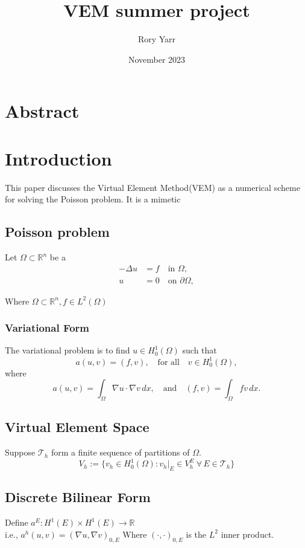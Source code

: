 \documentclass{article}
\title{VEM summer project}
\author{Rory Yarr}
\date{November 2023}
\begin{document}
\maketitle

\tableofcontents

\section{Abstract}



\section{Introduction}

This paper discusses the Virtual Element Method(VEM) as a numerical scheme for solving the Poisson problem. It is a mimetic 

\subsection{Poisson problem}
Let $\Omega \subset \mathbb{R}^n$ be a
\begin{align}
    -\Delta u &= f \quad \text{in } \Omega, \label{eq:poisson}\\
    u &= 0 \quad \text{on } \partial \Omega, \label{eq:dirichlet}
\end{align}

Where $\Omega \subset \mathbb{R}^n, f \in L^2(\Omega)$ %

\subsubsection{Variational Form}
The variational problem is to find $ u \in H^1_0(\Omega)$ such that 
\[ a(u,v) = (f,v), \quad \text{for all} \quad v \in H^1_0(\Omega),\]
where 
\[ a(u,v) = \int_{\Omega} \nabla u \cdot \nabla v \,dx, \quad \text{and}\quad 
(f,v) =\int_{\Omega} f v \,dx. \]


\subsection{Virtual Element Space}
Suppose $\mathcal{T}_h$ form a finite sequence of partitions of $\Omega$.
$$V_h:= \{v_h \in H^1_0(\Omega):v_h|_E \in V_h^E\  \forall \, E \in \mathcal{T}_h\}$$  

\subsection{Discrete Bilinear Form}
Define $a^E:H^1(E)\times H^1(E)\rightarrow \mathbb{R}$\\
i.e., $a^h(u,v)=(\nabla u,\nabla v)_{0,E}$
Where $(\cdot,\cdot)_{0,E}$ is the $L^2$ inner product.
\end{document}
